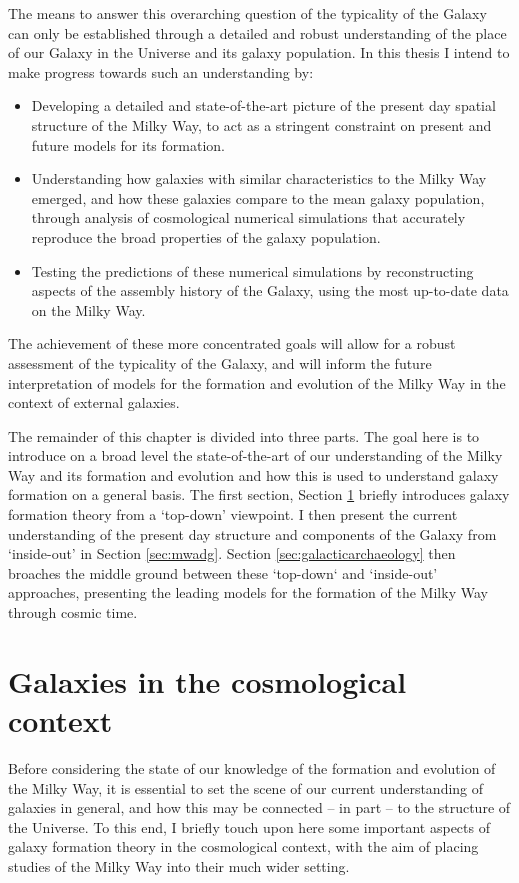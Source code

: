 The means to answer this overarching question of the typicality of the Galaxy can only be established through a detailed and robust understanding of the place of our Galaxy in the Universe and its galaxy population. In this thesis I intend to make progress towards such an understanding by:
\begin{itemize}
    \item Developing a detailed and state-of-the-art picture of the present day spatial structure of the Milky Way, to act as a stringent constraint on present and future models for its formation.
    \item Understanding how galaxies with similar characteristics to the Milky Way emerged, and how these galaxies compare to the mean galaxy population, through analysis of cosmological numerical simulations that accurately reproduce the broad properties of the galaxy population.
    \item Testing the predictions of these numerical simulations by reconstructing aspects of the assembly history of the Galaxy, using the most up-to-date data on the Milky Way.
\end{itemize}
The achievement of these more concentrated goals will allow for a robust assessment of the typicality of the Galaxy, and will inform the future interpretation of models for the formation and evolution of the Milky Way in the context of external galaxies.

The remainder of this chapter is divided into three parts. The goal here is to introduce on a broad level the state-of-the-art of our understanding of the Milky Way and its formation and evolution and how this is used to understand galaxy formation on a general basis. The first section, Section \ref{sec:cosmocontext} briefly introduces galaxy formation theory from a `top-down' viewpoint. I then present the current understanding of the present day structure and components of the Galaxy from `inside-out' in Section \ref{sec:mwadg}. Section \ref{sec:galacticarchaeology} then broaches the middle ground between these `top-down` and `inside-out' approaches, presenting the leading models for the formation of the Milky Way through cosmic time.

\section{Galaxies in the cosmological context}
\label{sec:cosmocontext}
Before considering the state of our knowledge of the formation and evolution of the Milky Way, it is essential to set the scene of our current understanding of galaxies in general, and how this may be connected -- in part -- to the structure of the Universe. To this end, I briefly touch upon here some important aspects of galaxy formation theory in the cosmological context, with the aim of placing studies of the Milky Way into their much wider setting.

